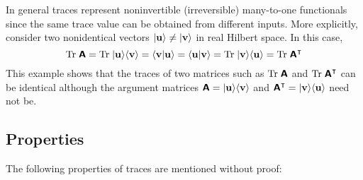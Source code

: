 In general traces represent noninvertible (irreversible) many-to-one functionals
since the same trace value can be obtained from different inputs.
More explicitly, consider two nonidentical vectors  $\vert {\bf u} \rangle \neq \vert {\bf v} \rangle$ in real Hilbert space.
In this case,
\begin{equation}
\textrm{Tr}\;\textsf{\textbf{A}} =
\textrm{Tr}\;\vert {\bf u} \rangle \langle {\bf v} \rangle =
\langle {\bf v} \vert  {\bf u} \rangle
=
\langle {\bf u} \vert  {\bf v} \rangle =
\textrm{Tr}\;\vert {\bf v} \rangle \langle {\bf u} \rangle =
\textrm{Tr}\;\textsf{\textbf{A}}^\intercal
\end{equation}
This example shows that the traces of two matrices such as $\textrm{Tr}\;\textsf{\textbf{A}}$ and $\textrm{Tr}\;\textsf{\textbf{A}}^\intercal $ can be identical although
the argument matrices  $\textsf{\textbf{A}}=\vert {\bf u} \rangle \langle {\bf v} \rangle
$ and $\textsf{\textbf{A}}^\intercal  = \vert {\bf v} \rangle \langle {\bf u} \rangle$ need not be.

\subsection{Properties}

The following properties of traces are mentioned without proof:

